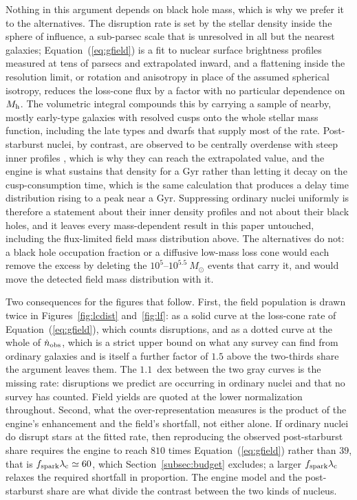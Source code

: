\documentclass[twocolumn,pdftex]{aastex701}
\newcommand{\msun}{M_{\odot}\xspace}
\newcommand{\fspark}{f_{\rm spark}\xspace}
\newcommand{\lamc}{\lambda_{\rm c}\xspace}
\begin{document}
Nothing in this argument depends on black hole mass, which is why we prefer it to the alternatives. The disruption rate is set by the stellar density inside the sphere of influence, a sub-parsec scale that is unresolved in all but the nearest galaxies; Equation~(\ref{eq:gfield}) is a fit to nuclear surface brightness profiles measured at tens of parsecs and extrapolated inward, and a flattening inside the resolution limit, or rotation and anisotropy in place of the assumed spherical isotropy, reduces the loss-cone flux by a factor with no particular dependence on $M_{\rm h}$. The volumetric integral compounds this by carrying a sample of nearby, mostly early-type galaxies with resolved cusps onto the whole stellar mass function, including the late types and dwarfs that supply most of the rate. Post-starburst nuclei, by contrast, are observed to be centrally overdense with steep inner profiles \citep{French:2016a,French:2020a}, which is why they can reach the extrapolated value, and the engine is what sustains that density for a Gyr rather than letting it decay on the cusp-consumption time, which is the same calculation that produces a delay time distribution rising to a peak near a Gyr. Suppressing ordinary nuclei uniformly is therefore a statement about their inner density profiles and not about their black holes, and it leaves every mass-dependent result in this paper untouched, including the flux-limited field mass distribution above. The alternatives do not: a black hole occupation fraction or a diffusive low-mass loss cone would each remove the excess by deleting the $10^{5}$--$10^{5.5}~\msun$ events that carry it, and would move the detected field mass distribution with it.

Two consequences for the figures that follow. First, the field population is drawn twice in Figures~\ref{fig:lcdist} and~\ref{fig:lf}: as a solid curve at the loss-cone rate of Equation~(\ref{eq:gfield}), which counts disruptions, and as a dotted curve at the whole of $\dot{n}_{\rm obs}$, which is a strict upper bound on what any survey can find from ordinary galaxies and is itself a further factor of $1.5$ above the two-thirds share the argument leaves them. The $1.1$~dex between the two gray curves is the missing rate: disruptions we predict are occurring in ordinary nuclei and that no survey has counted. Field yields are quoted at the lower normalization throughout. Second, what the over-representation measures is the product of the engine's enhancement and the field's shortfall, not either alone. If ordinary nuclei do disrupt stars at the fitted rate, then reproducing the observed post-starburst share requires the engine to reach $810$ times Equation~(\ref{eq:gfield}) rather than $39$, that is $\fspark \lamc \simeq 60$, which Section~\ref{subsec:budget} excludes; a larger $\fspark \lamc$ relaxes the required shortfall in proportion. The engine model and the post-starburst share are what divide the contrast between the two kinds of nucleus.
\end{document}
